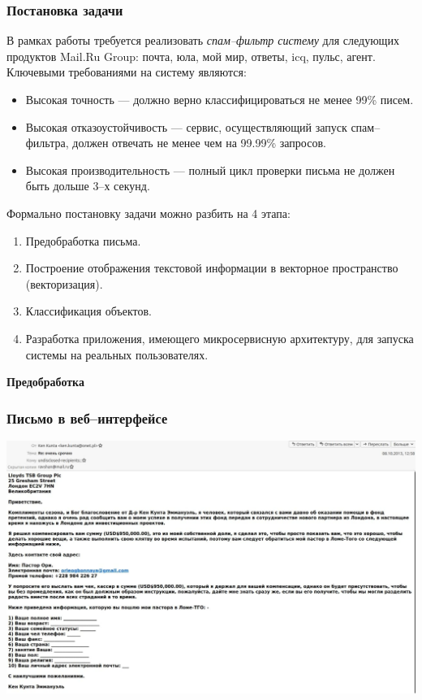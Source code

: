 \documentclass[compress,professionalfont]{beamer}
\begin{document}
\begin{frame}
\frametitle{Постановка задачи}

В рамках работы требуется реализовать \emph{спам--фильтр систему} для следующих продуктов Mail.Ru Group: почта, юла, мой мир, ответы, icq, пульс, агент. Ключевыми требованиями на систему являются:
\begin{itemize}
\item Высокая точность --- должно верно классифицироваться не менее 99\% писем.
\item Высокая отказоустойчивость --- сервис, осуществляющий запуск спам--фильтра, должен отвечать не менее чем на 99.99\% запросов.
\item Высокая производительность --- полный цикл проверки письма не должен быть дольше 3--х секунд.
\end{itemize}

Формально постановку задачи можно разбить на 4 этапа:
\begin{enumerate}
\item Предобработка письма.
\item Построение отображения текстовой информации в векторное пространство (векторизация).
\item Классификация объектов.
\item Разработка приложения, имеющего микросервисную архитектуру, для запуска системы на реальных пользователях.
\end{enumerate}

\end{frame}

\begin{frame}

\begin{center}
\Huge\bf Предобработка
\end{center}

\end{frame}

\begin{frame}
\frametitle{Письмо в веб--интерфейсе}

\begin{center}
\includegraphics[width=.95\textwidth]{eml.jpg}
\end{center}

\end{frame}
\end{document}
